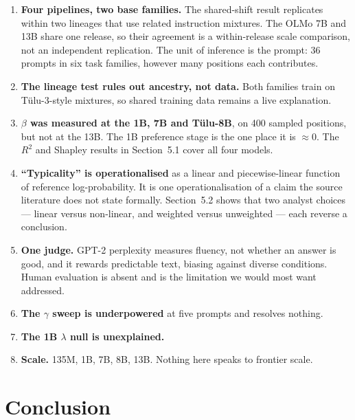 \documentclass[11pt]{article}
\begin{document}
\begin{enumerate}
\item \textbf{Four pipelines, two base families.} The shared-shift result replicates
within two lineages that use related instruction mixtures. The OLMo 7B and 13B
share one release, so their agreement is a within-release scale comparison, not an
independent replication. The unit of inference is the prompt: 36 prompts in six
task families, however many positions each contributes.
\item \textbf{The lineage test rules out ancestry, not data.} Both families train on
T\"ulu-3-style mixtures, so shared training data remains a live explanation.
\item \textbf{$\beta$ was measured at the 1B, 7B and T\"ulu-8B}, on 400 sampled
positions, but not at the 13B. The 1B preference stage is the one place it is
$\approx 0$. The $R^2$ and Shapley results in Section~5.1 cover all four models.
\item \textbf{``Typicality'' is operationalised} as a linear and piecewise-linear
function of reference log-probability. It is one operationalisation of a claim the
source literature does not state formally. Section~5.2 shows that two analyst
choices --- linear versus non-linear, and weighted versus unweighted --- each
reverse a conclusion.
\item \textbf{One judge.} GPT-2 perplexity measures fluency, not whether an answer is
good, and it rewards predictable text, biasing against diverse conditions. Human
evaluation is absent and is the limitation we would most want addressed.
\item \textbf{The $\gamma$ sweep is underpowered} at five prompts and resolves
nothing.
\item \textbf{The 1B $\lambda$ null is unexplained.}
\item \textbf{Scale.} 135M, 1B, 7B, 8B, 13B. Nothing here speaks to frontier scale.
\end{enumerate}

\section{Conclusion}
\end{document}
